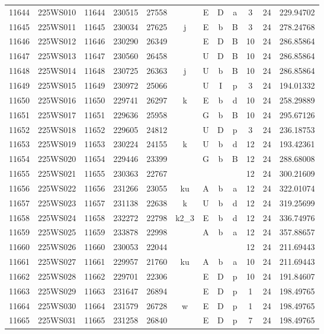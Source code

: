 \begin{tabular}{|*{12}{c|}}
11644 & 225WS010 & 11644 & 230515 & 27558 &  & E & D & a & 3 & 24 & 229.94702 \\ 
11645 & 225WS011 & 11645 & 230034 & 27625 & j & E & b & B & 3 & 24 & 278.24768 \\ 
11646 & 225WS012 & 11646 & 230290 & 26349 &  & E & D & B & 10 & 24 & 286.85864 \\ 
11647 & 225WS013 & 11647 & 230560 & 26458 &  & U & D & B & 10 & 24 & 286.85864 \\ 
11648 & 225WS014 & 11648 & 230725 & 26363 & j & U & b & B & 10 & 24 & 286.85864 \\ 
11649 & 225WS015 & 11649 & 230972 & 25066 &  & U & I & p & 3 & 24 & 194.01332 \\ 
11650 & 225WS016 & 11650 & 229741 & 26297 & k & E & b & d & 10 & 24 & 258.29889 \\ 
11651 & 225WS017 & 11651 & 229636 & 25958 &  & G & b & B & 10 & 24 & 295.67126 \\ 
11652 & 225WS018 & 11652 & 229605 & 24812 &  & U & D & p & 3 & 24 & 236.18753 \\ 
11653 & 225WS019 & 11653 & 230224 & 24155 & k & U & b & d & 12 & 24 & 193.42361 \\ 
11654 & 225WS020 & 11654 & 229446 & 23399 &  & G & b & B & 12 & 24 & 288.68008 \\ 
11655 & 225WS021 & 11655 & 230363 & 22767 &  &  &  &  & 12 & 24 & 300.21609 \\ 
11656 & 225WS022 & 11656 & 231266 & 23055 & ku & A & b & a & 12 & 24 & 322.01074 \\ 
11657 & 225WS023 & 11657 & 231138 & 22638 & k & U & b & d & 12 & 24 & 319.25699 \\ 
11658 & 225WS024 & 11658 & 232272 & 22798 & k2\_3 & E & b & d & 12 & 24 & 336.74976 \\ 
11659 & 225WS025 & 11659 & 233878 & 22998 &  & A & b & a & 12 & 24 & 357.88657 \\ 
11660 & 225WS026 & 11660 & 230053 & 22044 &  &  &  &  & 12 & 24 & 211.69443 \\ 
11661 & 225WS027 & 11661 & 229957 & 21760 & ku & A & b & a & 10 & 24 & 211.69443 \\ 
11662 & 225WS028 & 11662 & 229701 & 22306 &  & E & D & p & 10 & 24 & 191.84607 \\ 
11663 & 225WS029 & 11663 & 231647 & 26894 &  & E & D & p & 1 & 24 & 198.49765 \\ 
11664 & 225WS030 & 11664 & 231579 & 26728 & w & E & D & p & 1 & 24 & 198.49765 \\ 
11665 & 225WS031 & 11665 & 231258 & 26840 &  & E & D & p & 7 & 24 & 198.49765 \\ 

\end{tabular}
